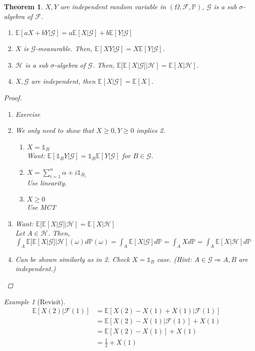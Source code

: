 \documentclass[12pt]{report}
\renewcommand{\P}{\mathbb{P}}
\newcommand{\F}{\mathcal{F}}
\newcommand{\E}{\mathbb{E}}
\renewcommand{\1}{\mathbb{1}}
\renewcommand{\O}{\Omega}
\theoremstyle{break}
\newtheorem{thm}{Theorem}[section] %
\theoremstyle{newdef}
\theoremstyle{remark}
\newtheorem*{exmp}{Example} %
\begin{document}
\begin{thm}
$X, Y$ are independent random variable in $(\O,\F,\P)$, $\mathcal{G}$ is a sub $\sigma$-algebra of $\F$.
\begin{enumerate}
\item $\E[aX + bY | \mathcal{G}] = a\E[X|\mathcal{G}] + b\E[Y|\mathcal{G}]$
\item $X$ is $\mathcal{G}$-measurable.
Then, $\E[XY|\mathcal{G}] = X\E[Y|\mathcal{G}]$.
\item $\mathcal{H}$ is a sub $\sigma$-algebra of $\mathcal{G}$. Then,
$\E[\E[X|\mathcal{G}]|\mathcal{H}] = \E[X|\mathcal{H}]$.
\item $X, \mathcal{G}$ are independent, then $\E[X|\mathcal{G}] = \E[X]$.
\end{enumerate}

\begin{proof}
\begin{enumerate}
\item Exercise

\item We only need to show that $X \geq 0, Y \geq 0$ implies 2.
\begin{enumerate}
\item $X = \1_B$\\
Want: $\E[\1_B Y | \mathcal{G}] = \1_B \E[Y | \mathcal{G}]$ for $B \in \mathcal{G}$.

\item $X = \sum_{i=1}^n \alpha+i \1_{B_i}$\\
Use linearity.

\item $X \geq 0$\\
Use MCT

\end{enumerate}

\item Want: $\E[\E[X|\mathcal{G}]|\mathcal{H}] = \E[X|\mathcal{H}]$\\
Let $A \in \mathcal{H}$.
Then, $\int_A \E[\E[X|\mathcal{G}]|\mathcal{H}](\omega) d\P(\omega)
= \int_A \E[X|\mathcal{G}] d\P
= \int_A Xd\P
= \int_A \E[X|\mathcal{H}]d\P$

\item Can be shown similarly as in 2.
Check $X = \1_B$ case. (Hint: $A \in \mathcal{G} \Rightarrow A, B$ are independent.)
\end{enumerate}
\end{proof}
\end{thm}


\begin{exmp}[Revisit]
$$
\begin{aligned}
\E[X(2) | \F(1)]
&= \E[X(2) - X(1) + X(1) | \F(1)]\\
&= \E[X(2) - X(1) | \F(1)] + X(1)\\
&= \E[X(2) - X(1)] + X(1)\\
&= \frac{1}{2} + X(1)
\end{aligned}
$$
\end{exmp}
\end{document}
